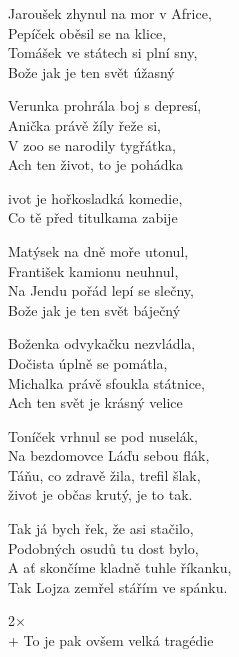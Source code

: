 
\ve{}
Jaroušek zhynul na mor v Africe,\\
Pepíček oběsil se na klice,\\
Tomášek ve státech si plní sny,\\
Bože jak je ten svět úžasný

\ve{}
Verunka prohrála boj s depresí,\\
Anička právě žíly řeže si,\\
V zoo se narodily tygřátka,\\
Ach ten život, to je pohádka

\cho{}
ivot je hořkosladká komedie,\\
Co tě před titulkama zabije

\ve{}
Matýsek na dně moře utonul,\\
František kamionu neuhnul,\\
Na Jendu pořád lepí se slečny,\\
Bože jak je ten svět báječný

\ve{}
Boženka odvykačku nezvládla,\\
Dočista úplně se pomátla,\\
Michalka právě sfoukla státnice,\\
Ach ten svět je krásný velice

\cho{}

\ve{}
Toníček vrhnul se pod nuselák,\\
Na bezdomovce Láďu sebou flák,\\
Táňu, co zdravě žila, trefil šlak,\\
život je občas krutý, je to tak.

\ve{}
Tak já bych řek, že asi stačilo,\\
Podobných osudů tu dost bylo,\\
A ať skončíme kladně tuhle říkanku,\\
Tak Lojza zemřel stářím ve spánku.

\cho{}
2×\\
+ To je pak ovšem velká tragédie

\esong{}